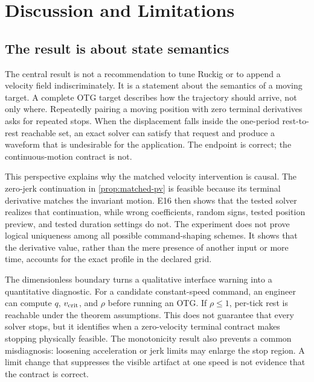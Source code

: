 \section{Discussion and Limitations}
\label{sec:discussion}

\subsection{The result is about state semantics}

The central result is not a recommendation to tune Ruckig or to append a velocity field indiscriminately. It is a statement about the semantics of a moving target. A complete OTG target describes how the trajectory should arrive, not only where. Repeatedly pairing a moving position with zero terminal derivatives asks for repeated stops. When the displacement falls inside the one-period rest-to-rest reachable set, an exact solver can satisfy that request and produce a waveform that is undesirable for the application. The endpoint is correct; the continuous-motion contract is not.

This perspective explains why the matched velocity intervention is causal. The zero-jerk continuation in \cref{prop:matched-pv} is feasible because its terminal derivative matches the invariant motion. E16 then shows that the tested solver realizes that continuation, while wrong coefficients, random signs, tested position preview, and tested duration settings do not. The experiment does not prove logical uniqueness among all possible command-shaping schemes. It shows that the derivative value, rather than the mere presence of another input or more time, accounts for the exact profile in the declared grid.

The dimensionless boundary turns a qualitative interface warning into a quantitative diagnostic. For a candidate constant-speed command, an engineer can compute $q$, $v_{\mathrm{crit}}$, and $\rho$ before running an OTG. If $\rho\le1$, per-tick rest is reachable under the theorem assumptions. This does not guarantee that every solver stops, but it identifies when a zero-velocity terminal contract makes stopping physically feasible. The monotonicity result also prevents a common misdiagnosis: loosening acceleration or jerk limits may enlarge the stop region. A limit change that suppresses the visible artifact at one speed is not evidence that the contract is correct.

